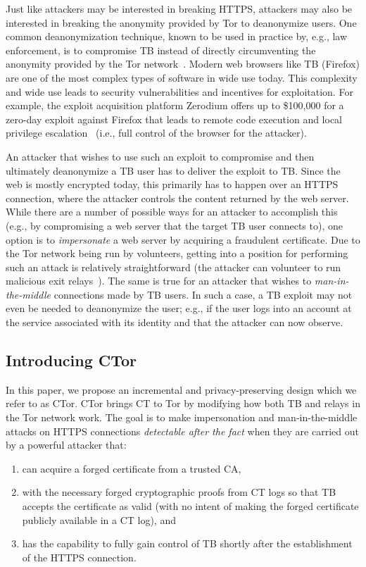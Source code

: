 Just like attackers may be interested in breaking HTTPS, attackers may also be
interested in breaking the anonymity provided by Tor to deanonymize users. One
common deanonymization technique, known to be used in practice by, e.g., law
enforcement, is to compromise TB instead of directly circumventing the anonymity
provided by the Tor network~\cite{selfrando,lepop1,lepop2,zerotor}. Modern web
browsers like TB (Firefox) are one of the most complex types of software in wide
use today. This complexity and wide use leads to security vulnerabilities and
incentives for exploitation. For example, the exploit acquisition platform
Zerodium offers up to \$100,000 for a zero-day exploit against Firefox that
leads to remote code execution and local privilege escalation~\cite{zeromain}
(i.e., full control of the browser for the attacker).

An attacker that wishes to use such an exploit to compromise and then ultimately
deanonymize a TB user has to deliver the exploit to TB\@. Since the web is
mostly encrypted today, this primarily has to happen over an HTTPS connection,
where the attacker controls the content returned by the web server. While there
are a number of possible ways for an attacker to accomplish this (e.g., by
compromising a web server that the target TB user connects to), one option is to
\emph{impersonate} a web server by acquiring a fraudulent certificate. Due to
the Tor network being run by volunteers, getting into a position for performing
such an attack is relatively straightforward (the attacker can volunteer to run
malicious exit relays~\cite{spoiled-onions}). The same is true for an attacker that
wishes to \emph{man-in-the-middle} connections made by TB users. In such a case,
a TB exploit may not even be needed to deanonymize the user; e.g., if the user
logs into an account at the service associated with its identity and that the
attacker can now observe.

\subsection{Introducing CTor}
In this paper, we propose an incremental and privacy-preserving design which we
refer to as CTor. CTor brings CT to Tor by modifying how both TB and relays in
the Tor network work. The goal is to make impersonation and man-in-the-middle
attacks on HTTPS connections \emph{detectable after the fact} when they are
carried out by a powerful attacker that:
\begin{enumerate}
	\item can acquire a forged certificate from a trusted CA,
	\item with the necessary forged cryptographic proofs from CT logs so that TB
	accepts the certificate as valid (with no intent of making the forged
	certificate publicly available in a CT log), and
	\item has the capability to fully gain control of TB shortly after the
	establishment of the HTTPS connection.
\end{enumerate}

